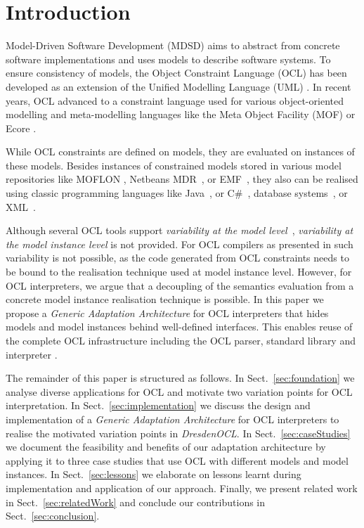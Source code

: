 \section{Introduction}
	Model-Driven Software Development (MDSD) aims to abstract from concrete 
	software implementations and uses models to describe software systems. 
	To ensure consistency of models, the Object Constraint Language 
	(OCL) \cite{spec:OCL2-2} has been developed as an extension of the Unified 
	Modelling Language (UML) \cite{spec:UML2-2}\cite{warmer:ocl}. In recent years,
	OCL advanced to a constraint language used for various object-oriented
	modelling and meta-modelling languages \cite{detaching} like the Meta
	Object Facility (MOF) \cite{UmlMof} or Ecore \cite{WWW:MDT}.

	While OCL constraints are defined on models,
	they are evaluated on instances of these models.
	 Besides instances of constrained models stored in various model repositories
	like MOFLON \cite{MOFLON}, Netbeans MDR~\cite{UmlMof}, or EMF~\cite{WWW:MDT},
	they also can be realised using classic programming languages like
	Java~\cite{demuthRGWS09}, or C\#~\cite{OCLCsharp}, database systems~\cite{OCLRelDB}, or XML~\cite{OCLXML}. 
	
	Although several OCL tools support \emph{variability at the model level}~\cite{braeuerOCL07}\cite{akehurst2003ocl}, \emph{variability at the model
	instance level} is not provided. 
	For OCL compilers as presented in
	\cite{UmlMof,demuthRGWS09,OCLCsharp,OCLRelDB} 
	such variability is not possible, as the code generated from OCL constraints 
	needs to be	bound to the realisation technique used at model instance
	level. 
	However, for OCL interpreters, we argue that a
	decoupling of the semantics evaluation from a concrete model instance realisation technique is possible.
	In this paper we propose a \emph{Generic Adaptation Architecture} for OCL
	interpreters that hides models and model instances behind well-defined
	interfaces. This enables reuse of the complete OCL infrastructure including the OCL parser, 
	standard library and interpreter .
	
	The remainder of this paper is structured as follows. In
	Sect.~\ref{sec:foundation} we analyse diverse applications for OCL and 
	motivate two variation points for OCL interpretation. In
	Sect.~\ref{sec:implementation} we discuss the design and implementation of a
	\emph{Generic Adaptation Architecture} for OCL interpreters to realise the
	motivated variation points in \emph{DresdenOCL}. In Sect.~\ref{sec:caseStudies}
	we document the feasibility and	benefits of our adaptation architecture by
	applying it to three case studies that use OCL with different models and model
	instances. In Sect.~\ref{sec:lessons} we elaborate on lessons learnt
	during implementation and application of our approach. Finally, we present
	related work in Sect.~\ref{sec:relatedWork} and conclude our contributions in
	Sect.~\ref{sec:conclusion}.
	
